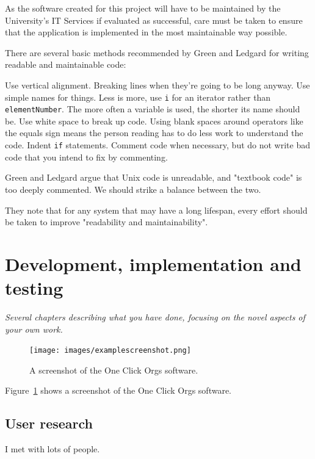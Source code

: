 \documentclass[]{scrartcl}
\begin{document}
As the software created for this project will have to be maintained by the University's IT Services if evaluated as successful, care must be taken to ensure that the application is implemented in the most maintainable way possible.

There are several basic methods recommended by Green and Ledgard \cite{Green:2011:CGF:2063166.2063168} for writing readable and maintainable code:

Use vertical alignment. Breaking lines when they're going to be long anyway. Use simple names for things. Less is more, use \texttt{i} for an iterator rather than \texttt{elementNumber}. The more often a variable is used, the shorter its name should be. Use white space to break up code. Using blank spaces around operators like the equals sign means the person reading has to do less work to understand the code. Indent \texttt{if} statements. Comment code when necessary, but do not write bad code that you intend to fix by commenting.

Green and Ledgard argue that Unix code is unreadable, and "textbook code" is too deeply commented. We should strike a balance between the two.

They note that for any system that may have a long lifespan, every effort should be taken to improve "readability and maintainability".

\section{Development, implementation and testing}

\textit{Several chapters describing what you have done, focusing on the novel aspects of your own work.}

\begin{figure}
  \begin{center}
    \texttt{[image: images/examplescreenshot.png]}
  \end{center}
  \caption{A screenshot of the One Click Orgs software.}
  \label{ocoscreenshot}
\end{figure}

Figure~\ref{ocoscreenshot} shows a screenshot of the One Click Orgs software.

\subsection{User research}

I met with lots of people.
\end{document}

